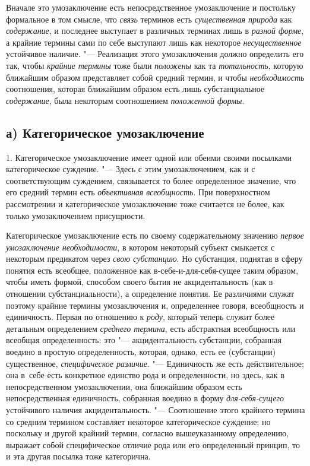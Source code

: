 Вначале это умозаключение есть непосредственное умозаключение
и постольку формальное в том смысле, что
{\em связь} терминов есть
{\em существенная природа}
как {\em содержание},
и последнее выступает в различных терминах лишь в
{\em разной форме}, а
крайние термины сами по себе выступают лишь как некоторое
{\em несущественное}
устойчивое наличие. "--- Реализация этого
умозаключения должно определить его так, чтобы
{\em крайние термины
}тоже были
{\em положены} как та
{\em тотальность},
которую ближайшим образом представляет собой средний термин,
и чтобы {\em необходимость}
соотношения, которая ближайшим образом есть лишь
субстанциальное {\em содержание},
была некоторым соотношением
{\em положенной формы}.

\subsection[а) Категорическое умозаключение]{а) Категорическое умозаключение}

1. Категорическое умозаключение имеет одной или обеими своими
посылками категорическое
суждение.
"--- Здесь с этим умозаключением, как и с соответствующим
суждением, связывается то более определенное значение, что
его средний термин есть {\em объективная
всеобщность}. При поверхностном рассмотрении и
категорическое умозаключение тоже считается не более, как только
умозаключением присущности.

Категорическое умозаключение есть по своему содержательному
значению {\em первое умозаключение
необходимости}, в котором некоторый субъект смыкается с
некоторым предикатом через {\em свою
субстанцию}. Но субстанция, поднятая в сферу понятия есть
всеобщее, положенное как в-себе-и-для-себя-сущее таким образом, чтобы иметь
формой, способом своего бытия не акцидентальность (как в отношении
субстанциальности), а определение понятия. Ее различиями служат поэтому
крайние термины умозаключения и, определеннее говоря, всеобщность и
единичность. Первая по отношению к
{\em роду}, который
теперь служит более детальным определением
{\em среднего термина},
есть абстрактная всеобщность или всеобщая определенность:
это "--- акцидентальность субстанции, собранная воедино в
простую определенность, которая, однако, есть ее (субстанции) существенное,
{\em специфическое различие}. "---
Единичность же есть действительное; она в~себе есть
конкретное единство рода и определенности, но здесь, как в непосредственном
умозаключении, она ближайшим образом есть непосредственная единичность,
собранная воедино в форму
{\em для-себя-сущего}
устойчивого наличия акцидентальность. "---
Соотношение этого крайнего термина со средним термином
составляет некоторое категорическое суждение; но поскольку и другой крайний
термин, согласно вышеуказанному определению, выражает собой специфическое
отличие рода или его определенный принцип, то и эта другая посылка тоже
категорична.

